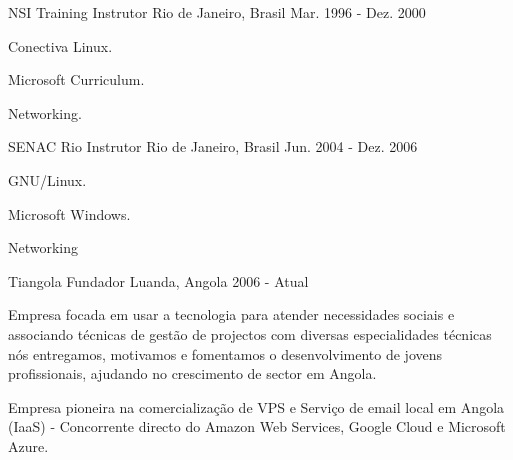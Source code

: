 


\begin{cventries}

\cventry
{NSI Training} %
{Instrutor} %
{Rio de Janeiro, Brasil} %
{Mar. 1996 - Dez. 2000} %
{ %
\begin{cvitems}
\item {Conectiva Linux.}
\item {Microsoft Curriculum.}
\item {Networking.}
\end{cvitems}
}


\cventry
{SENAC Rio} %
{Instrutor} %
{Rio de Janeiro, Brasil} %
{Jun. 2004 - Dez. 2006} %
{ %
\begin{cvitems}
\item {GNU/Linux.}
\item {Microsoft Windows.}
\item {Networking}
\end{cvitems}
}


\cventry
{Tiangola} %
{Fundador} %
{Luanda, Angola} %
{2006 - Atual} %
{ %
\begin{cvitems}
\item {Empresa focada em usar a tecnologia para atender necessidades sociais e associando técnicas de gestão de projectos com diversas especialidades técnicas nós entregamos, motivamos e fomentamos o desenvolvimento de jovens profissionais, ajudando no crescimento de sector em Angola.}
\item {Empresa pioneira na comercialização de VPS e Serviço de email local em Angola (IaaS) - Concorrente directo do Amazon Web Services, Google Cloud e Microsoft Azure.}
\end{cvitems}
}


\end{cventries}
